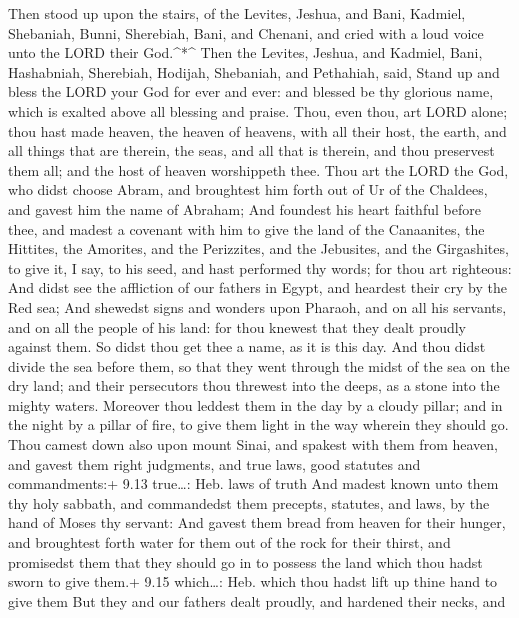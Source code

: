  Then stood up upon the stairs, of the Levites, Jeshua, and
Bani, Kadmiel, Shebaniah, Bunni, Sherebiah, Bani, and Chenani, and cried
with a loud voice unto the LORD their God.\^{}*\^{}  Then
the Levites, Jeshua, and Kadmiel, Bani, Hashabniah, Sherebiah, Hodijah,
Shebaniah, and Pethahiah, said, Stand up and bless the LORD your God for
ever and ever: and blessed be thy glorious name, which is exalted above
all blessing and praise.  Thou, even thou, art LORD alone;
thou hast made heaven, the heaven of heavens, with all their host, the
earth, and all things that are therein, the seas, and all that is
therein, and thou preservest them all; and the host of heaven
worshippeth thee.  Thou art the LORD the God, who didst
choose Abram, and broughtest him forth out of Ur of the Chaldees, and
gavest him the name of Abraham;  And foundest his heart
faithful before thee, and madest a covenant with him to give the land of
the Canaanites, the Hittites, the Amorites, and the Perizzites, and the
Jebusites, and the Girgashites, to give it, I say, to his seed, and hast
performed thy words; for thou art righteous:  And didst see
the affliction of our fathers in Egypt, and heardest their cry by the
Red sea;  And shewedst signs and wonders upon Pharaoh, and
on all his servants, and on all the people of his land: for thou knewest
that they dealt proudly against them. So didst thou get thee a name, as
it is this day.  And thou didst divide the sea before them,
so that they went through the midst of the sea on the dry land; and
their persecutors thou threwest into the deeps, as a stone into the
mighty waters.  Moreover thou leddest them in the day by a
cloudy pillar; and in the night by a pillar of fire, to give them light
in the way wherein they should go.  Thou camest down also
upon mount Sinai, and spakest with them from heaven, and gavest them
right judgments, and true laws, good statutes and commandments:+ 9.13
true\ldots: Heb. laws of truth  And madest known unto them
thy holy sabbath, and commandedst them precepts, statutes, and laws, by
the hand of Moses thy servant:  And gavest them bread from
heaven for their hunger, and broughtest forth water for them out of the
rock for their thirst, and promisedst them that they should go in to
possess the land which thou hadst sworn to give them.+ 9.15 which\ldots:
Heb. which thou hadst lift up thine hand to give them  But
they and our fathers dealt proudly, and hardened their necks, and
